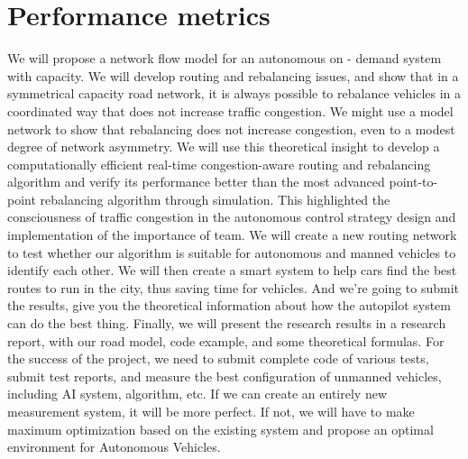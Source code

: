 \documentclass[letterpaper,10pt,draftclsnofoot,onecolumn]{IEEEtran}
\begin{document}
\section{Performance metrics}
We will propose a network flow model for an autonomous on - demand system with capacity. We will develop routing and rebalancing issues, and show that in a symmetrical capacity road network, it is always possible to rebalance vehicles in a coordinated way that does not increase traffic congestion. We might use a model network to show that rebalancing does not increase congestion, even to a modest degree of network asymmetry. We will use this theoretical insight to develop a computationally efficient real-time congestion-aware routing and rebalancing algorithm and verify its performance better than the most advanced point-to-point rebalancing algorithm through simulation. This highlighted the consciousness of traffic congestion in the autonomous control strategy design and implementation of the importance of team. We will create a new routing network to test whether our algorithm is suitable for autonomous and manned vehicles to identify each other. We will then create a smart system to help cars find the best routes to run in the city, thus saving time for vehicles. And we're going to submit the results, give you the theoretical information about how the autopilot system can do the best thing. Finally, we will present the research results in a research report, with our road model, code example, and some theoretical formulas. For the success of the project, we need to submit complete code of various tests, submit test reports, and measure the best configuration of unmanned vehicles, including AI system, algorithm, etc. If we can create an entirely new measurement system, it will be more perfect. If not, we will have to make maximum optimization based on the existing system and propose an optimal environment for Autonomous Vehicles.
\end{document}
